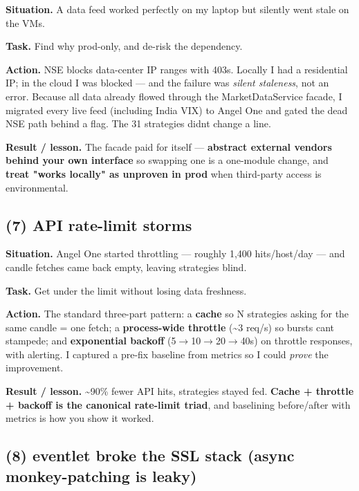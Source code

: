 \documentclass[11pt]{article}
\begin{document}
\textbf{Situation.} A data feed worked perfectly on my laptop but silently went stale on the VMs.

\textbf{Task.} Find why prod-only, and de-risk the dependency.

\textbf{Action.} NSE blocks data-center IP ranges with 403s. Locally I had a residential IP; in the
cloud I was blocked --- and the failure was \emph{silent staleness}, not an error. Because all data
already flowed through the MarketDataService facade, I migrated every live feed (including India
VIX) to Angel One and gated the dead NSE path behind a flag. The 31 strategies didn\textquotesingle t change a
line.

\textbf{Result / lesson.} The facade paid for itself --- \textbf{abstract external vendors behind your own
interface} so swapping one is a one-module change, and \textbf{treat "works locally" as unproven in
prod} when third-party access is environmental.

\subsection{(7) API rate-limit storms}\label{7-api-rate-limit-storms}

\textbf{Situation.} Angel One started throttling --- roughly 1,400 hits/host/day --- and candle fetches
came back empty, leaving strategies blind.

\textbf{Task.} Get under the limit without losing data freshness.

\textbf{Action.} The standard three-part pattern: a \textbf{cache} so N strategies asking for the same
candle = one fetch; a \textbf{process-wide throttle} (\textasciitilde3 req/s) so bursts can\textquotesingle t stampede; and
\textbf{exponential backoff} (5\(\rightarrow\)10\(\rightarrow\)20\(\rightarrow\)40s) on throttle responses, with alerting. I captured a
pre-fix baseline from metrics so I could \emph{prove} the improvement.

\textbf{Result / lesson.} \textasciitilde90\% fewer API hits, strategies stayed fed. \textbf{Cache + throttle + backoff is
the canonical rate-limit triad}, and baselining before/after with metrics is how you show it
worked.

\subsection{(8) eventlet broke the SSL stack (async monkey-patching is leaky)}\label{8-eventlet-broke-the-ssl-stack-async-monkey-patching-is-leaky}
\end{document}
